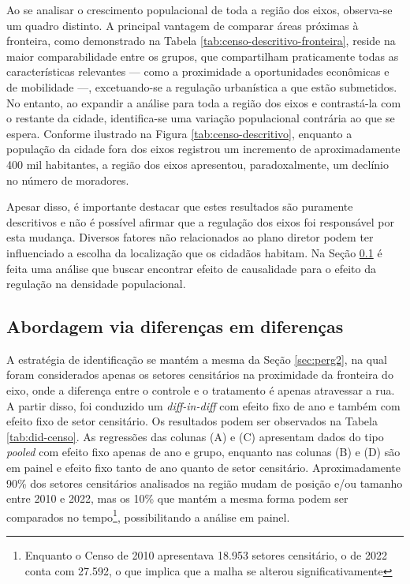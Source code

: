 Ao se analisar o crescimento populacional de toda a região dos eixos, observa-se um quadro distinto. A principal vantagem de comparar áreas próximas à fronteira, como demonstrado na Tabela \ref{tab:censo-descritivo-fronteira}, reside na maior comparabilidade entre os grupos, que compartilham praticamente todas as características relevantes — como a proximidade a oportunidades econômicas e de mobilidade —, excetuando-se a regulação urbanística a que estão submetidos. No entanto, ao expandir a análise para toda a região dos eixos e contrastá-la com o restante da cidade, identifica-se uma variação populacional contrária ao que se espera. Conforme ilustrado na Figura \ref{tab:censo-descritivo}, enquanto a população da cidade fora dos eixos registrou um incremento de aproximadamente 400 mil habitantes, a região dos eixos apresentou, paradoxalmente, um declínio no número de moradores.



Apesar disso, é importante destacar que estes resultados são puramente descritivos e não é possível afirmar que a regulação dos eixos foi responsável por esta mudança. Diversos fatores não relacionados ao plano diretor podem ter influenciado a escolha da localização que os cidadãos habitam. Na Seção \ref{subsec:perg3did} é feita uma análise que buscar encontrar efeito de causalidade para o efeito da regulação na densidade populacional.

\subsection{Abordagem via diferenças em diferenças}
\label{subsec:perg3did}

A estratégia de identificação se mantém a mesma da Seção \ref{sec:perg2}, na qual foram considerados apenas os setores censitários na proximidade da fronteira do eixo, onde a diferença entre o controle e o tratamento é apenas atravessar a rua. A partir disso, foi conduzido um \textit{diff-in-diff} com efeito fixo de ano e também com efeito fixo de setor censitário. Os resultados podem ser observados na Tabela \ref{tab:did-censo}. As regressões das colunas (A) e (C) apresentam dados do tipo \textit{pooled} com efeito fixo apenas de ano e grupo, enquanto nas colunas (B) e (D) são em painel e efeito fixo tanto de ano quanto de setor censitário. Aproximadamente 90\% dos setores censitários analisados na região mudam de posição e/ou tamanho entre 2010 e 2022, mas os 10\% que mantém a mesma forma podem ser comparados no tempo\footnote{Enquanto o Censo de 2010 apresentava 18.953 setores censitário, o de 2022 conta com 27.592, o que implica que a malha se alterou significativamente}, possibilitando a análise em painel. 

